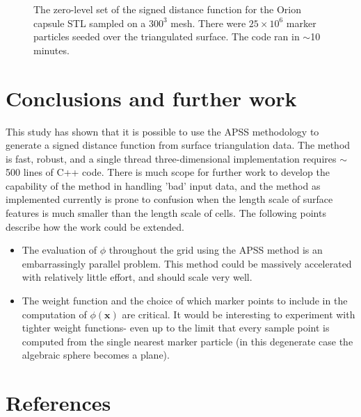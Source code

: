 \documentclass[final,3p,times,twocolumn]{elsarticle}
\begin{document}
\begin{figure}
\begin{subfigure}[b]{0.475\textwidth}
            \caption{}
            \label{ef4}
        \end{subfigure}
        \caption{The zero-level set of the signed distance function for the Orion capsule STL sampled on a $300^3$ mesh. There were $25\times 10^6$ marker particles seeded over the triangulated surface. The code ran in $\sim$10 minutes.}
        \label{SQ}
\end{figure}


\FloatBarrier

\section{Conclusions and further work}

This study has shown that it is possible to use the APSS methodology to generate a
signed distance function from surface triangulation data. The method is fast, robust, 
and a single thread three-dimensional implementation requires $\sim$500 lines of C++ code.
There is much scope for further work to develop the capability of the method in handling
'bad' input data, and the method as implemented currently is prone to confusion when
the length scale of surface features is much smaller than the length scale of cells.
The following points describe how the work could be extended.

\begin{itemize}
\item The evaluation of $\phi$ throughout the grid using the APSS method is an embarrassingly parallel
problem. This method could be massively accelerated with relatively little effort, and should scale very well.
\item The weight function and the choice of which marker points to include in the computation of
$\phi(\textbf{x})$ are critical. It would be interesting to experiment with tighter weight functions-
even up to the limit that every sample point is computed from the single nearest marker particle (in this degenerate case the algebraic sphere becomes a plane).
\end{itemize}




\section*{References}

%


\end{document}
